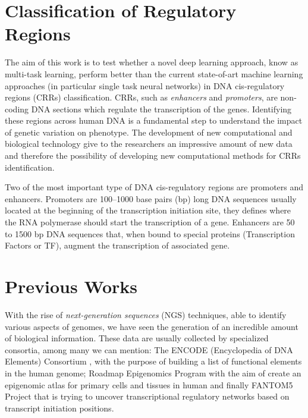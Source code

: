 \section{Classification of Regulatory Regions}
The aim of this work is to test whether a novel deep learning approach,
know as multi-task learning, perform better than the current state-of-art
machine learning approaches (in particular single task neural networks) in
DNA cis-regulatory regions (CRRs) classification. CRRs, such as
\emph{enhancers} and \emph{promoters}, are non-coding DNA sections which
regulate the transcription of the genes. Identifying these regions across
human DNA is a fundamental step to understand the impact of genetic
variation on phenotype. The development of new computational and
biological technology give to the researchers an impressive amount of new
data and therefore the possibility of developing new computational methods
for CRRs identification.

Two of the most important type of DNA cis-regulatory regions are promoters
and enhancers. Promoters are 100–1000 base pairs (bp) long DNA sequences
usually located at the beginning of the transcription initiation site,
they defines where the RNA polymerase should start the transcription of a
gene. Enhancers are 50 to 1500 bp DNA sequences that, when bound to
special proteins (Transcription Factors or TF), augment the transcription
of associated gene.

\section{Previous Works}
With the rise of \emph{next-generation sequences} (NGS) techniques, able
to identify various aspects of genomes, we have seen the generation of an
incredible amount of biological information. These data are usually
collected by specialized consortia, among many we can mention: The ENCODE
(Encyclopedia of DNA Elements) Consortium \cite{ENCODE_data}, with the purpose of building a list of functional elements in the human genome; Roadmap Epigenomics Program \cite{ROADMAP} with the aim of create an epigenomic atlas for primary cells and tissues in human and finally FANTOM5 Project \cite{FANTOM_data} that is trying to uncover transcriptional regulatory networks based on transcript initiation positions.

